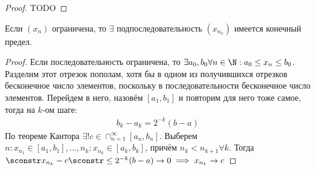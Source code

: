 \begin{proof}
   TODO 
\end{proof}
\begin{theorem}
    Если $ (x_n) $ ограничена, то $ \exists  $ подпоследовательность $ (x_{n_k}) $ имеется конечный предел.
\end{theorem}
\begin{proof}
    Если последовательность ограничена, то $ \exists a_0, b_0 \forall n \in \N: a_0 \leq  x_n \leq  b_0 $. Разделим этот отрезок пополам, хотя бы в одном из получившихся отрезков
    бесконечное число элементов, поскольку в последовательности бесконечное число элементов. Перейдем в него, назовём $ [a_1, b_1] $ и повторим для него тоже самое, тогда на $ k $-ом шаге:
    \begin{gather}
        b_k - a_k = 2^{ - k}(b - a)
    \end{gather}
    По теореме Кантора $ \exists ! c \in \cap_{n = 1}^\infty [a_n, b_n] $. Выберем $ n: x_{n_1}  \in [a_1, b_1], \dots , n_k : x_{n_k} \in [a_k, b_k]$, причём $ n_k < n_{k + 1} \forall k $.
    Тогда $ \sconstr x_{n_k} - c \sconstr \leq  2^{ - k}(b - a) \to  0 \implies  x_{n_k} \to c $
\end{proof}